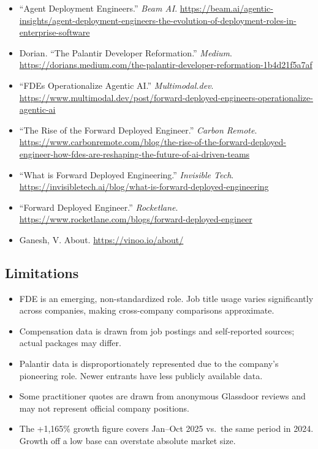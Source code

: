 {\begin{itemize}[itemsep=1pt]
    \item ``Agent Deployment Engineers.''
        \textit{Beam AI}.
        \url{https://beam.ai/agentic-insights/agent-deployment-engineers-the-evolution-of-deployment-roles-in-enterprise-software}

    \item Dorian. ``The Palantir Developer Reformation.''
        \textit{Medium}.
        \url{https://dorians.medium.com/the-palantir-developer-reformation-1b4d21f5a7af}

    \item ``FDEs Operationalize Agentic AI.''
        \textit{Multimodal.dev}.
        \url{https://www.multimodal.dev/post/forward-deployed-engineers-operationalize-agentic-ai}

    \item ``The Rise of the Forward Deployed Engineer.''
        \textit{Carbon Remote}.
        \url{https://www.carbonremote.com/blog/the-rise-of-the-forward-deployed-engineer-how-fdes-are-reshaping-the-future-of-ai-driven-teams}

    \item ``What is Forward Deployed Engineering.''
        \textit{Invisible Tech}.
        \url{https://invisibletech.ai/blog/what-is-forward-deployed-engineering}

    \item ``Forward Deployed Engineer.''
        \textit{Rocketlane}.
        \url{https://www.rocketlane.com/blogs/forward-deployed-engineer}

    \item Ganesh, V. About.
        \url{https://vinoo.io/about/}
\end{itemize}
}

\subsection{Limitations}

\begin{itemize}
    \item FDE is an emerging, non-standardized role. Job title usage
        varies significantly across companies, making cross-company
        comparisons approximate.
    \item Compensation data is drawn from job postings and self-reported
        sources; actual packages may differ.
    \item Palantir data is disproportionately represented due to
        the company's pioneering role. Newer entrants have less
        publicly available data.
    \item Some practitioner quotes are drawn from anonymous Glassdoor
        reviews and may not represent official company positions.
    \item The +1,165\% growth figure covers Jan--Oct 2025 vs.\ the
        same period in 2024. Growth off a low base can overstate
        absolute market size.
\end{itemize}

